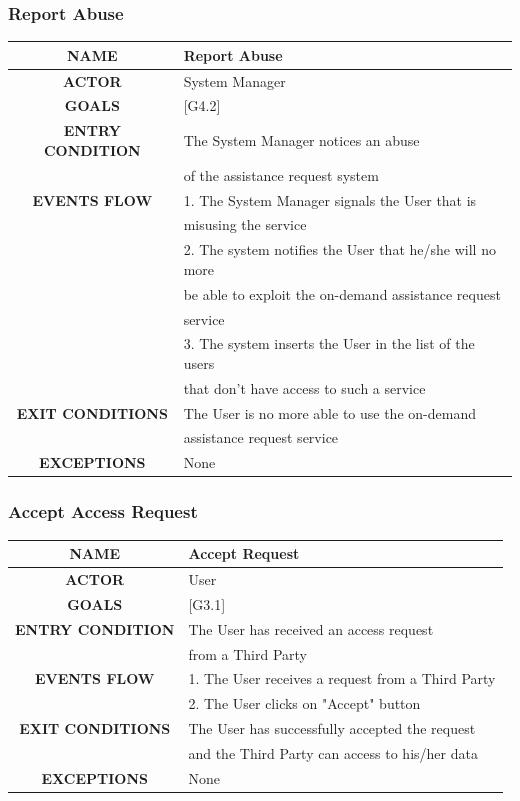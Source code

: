 \documentclass[12pt,a4paper]{article}
\begin{document}
		\subsubsection{Report Abuse}
		\begin{center}
			\begin{tabular}{| c | l |}
				\hline
				\textbf{NAME} & Report Abuse \\
				\hline
				\textbf{ACTOR} & System Manager \\
				\hline
				\textbf{GOALS} & [G4.2] \\
				\hline
				\textbf{ENTRY CONDITION} & The System Manager notices an abuse\\ 
				& of the assistance request system\\
				\hline
				\textbf{EVENTS FLOW}  &
				1. The System Manager signals the User that is \\
				& misusing the service\\
				&2. The system notifies the User that he/she will no more\\
				& be able to exploit the on-demand assistance request\\
				& service\\
				&3. The system inserts the User in the list of the users\\
				& that don't have access to such a service\\
				\hline
				\textbf{EXIT CONDITIONS}  & The User is no more able to use the on-demand\\
				& assistance request service\\ 
				\hline
				\textbf{EXCEPTIONS} & None \\
				\hline
			\end{tabular}
		\end{center}

		\newpage
		\subsubsection{Accept Access Request}
		\begin{center}
			\begin{tabular}{| c | l |}
				\hline
				\textbf{NAME} & Accept Request \\
				\hline
				\textbf{ACTOR} & User \\
				\hline
				\textbf{GOALS} & [G3.1] \\
				\hline
				\textbf{ENTRY CONDITION} & The User has received an access request\\
				& from a Third Party\\  \hline
				\textbf{EVENTS FLOW}  &
				1. The User receives a request from a Third Party\\
				&2. The User clicks on "Accept" button\\
				\hline
				\textbf{EXIT CONDITIONS}  & The User has successfully accepted the request\\ 
				& and the Third Party can access to his/her data\\
				\hline
				\textbf{EXCEPTIONS} &
				None\\
				\hline
			\end{tabular}
		\end{center}
\end{document}
